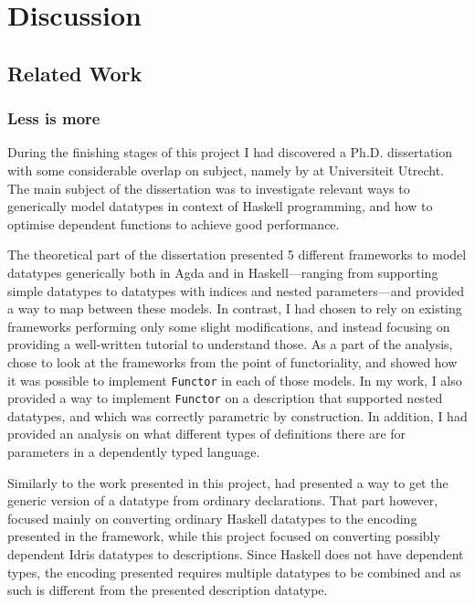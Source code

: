 \documentclass{ituthesis}
\newcommand{\tttype}[1]{\textcolor{type-color}{\texttt{#1}}}
\theoremstyle{break}
\begin{document}
\chapter{Discussion}
\label{cha:Discussion}

\section{Related Work}
\label{sec:Related Work}
\subsection{Less is more}
\label{sub:Less is more}
During the finishing stages of this project I had discovered a Ph.D. dissertation with some considerable overlap on subject, namely  by \cite{magalhaes2012less} at Universiteit Utrecht.
The main subject of the dissertation was to investigate relevant ways to generically model datatypes in context of Haskell programming, and how to optimise dependent functions to achieve good performance.

The theoretical part of the dissertation presented 5 different frameworks to model datatypes generically both in Agda and in Haskell---ranging from supporting simple datatypes to datatypes with indices and nested parameters---and provided a way to map between these models.
In contrast, I had chosen to rely on existing frameworks performing only some slight modifications, and instead focusing on providing a well-written tutorial to understand those.
As a part of the analysis, \citeauthor{magalhaes2012less} chose to look at the frameworks from the point of functoriality, and showed how it was possible to implement \tttype{Functor} in each of those models.
In my work, I also provided a way to implement \tttype{Functor} on a description that supported nested datatypes, and which was correctly parametric by construction.
In addition, I had provided an analysis on what different types of definitions there are for parameters in a dependently typed language.

Similarly to the work presented in this project, \citeauthor{magalhaes2012less} had presented a way to get the generic version of a datatype from ordinary declarations.
That part however, focused mainly on converting ordinary Haskell datatypes to the encoding presented in the framework, while this project focused on converting possibly dependent Idris datatypes to descriptions.
Since Haskell does not have dependent types, the encoding presented requires multiple datatypes to be combined and as such is different from the presented description datatype.
\end{document}
